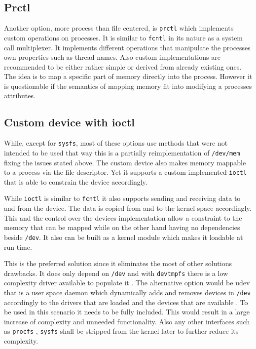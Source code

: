 \documentclass[
a4paper,
12pt,
notitlepage,
parskip=half,
DIV=11,
]{scrbook}
\begin{document}
		\subsection{Prctl}
		
		Another option, more process than file centered, is \texttt{prctl} which implements custom operations on processes.
		It is similar to \texttt{fcntl} in its nature as a system call multiplexer.
		It implements different operations that manipulate the processes own properties such as thread names.
		Also custom implementations are recommended to be either rather simple or derived from already existing ones.
		The idea is to map a specific part of memory directly into the process.
		However it is questionable if the semantics of mapping memory fit into modifying a processes attributes. \citep{syscall} \citep{prctl}
		
		\subsection{Custom device with ioctl}
		\label{hwio}
		
		While, except for \texttt{sysfs}, most of these options use methods that were not intended to be used that way this is a partially reimplementation of \texttt{/dev/mem} fixing the issues stated above.
		The custom device also makes memory mappable to a process via the file descriptor.
		Yet it supports a custom implemented \texttt{ioctl} that is able to constrain the device accordingly.
		
		While \texttt{ioctl} is similar to \texttt{fcntl} it also supports sending and receiving data to and from the device.
		The data is copied from and to the kernel space accordingly.
		This and the control over the devices implementation allow a constraint to the memory that can be mapped while on the other hand having no dependencies beside \texttt{/dev}.
		It also can be built as a kernel module which makes it loadable at run time. \citep{ioctl}
		
		This is the preferred solution since it eliminates the most of other solutions drawbacks.
		It does only depend on \texttt{/dev} and with \texttt{devtmpfs} there is a low complexity driver available to populate it \citep{devtmpfs}.
		The alternative option would be udev that is a user space daemon which dynamically adds and removes devices in \texttt{/dev} accordingly to the drivers that are loaded and the devices that are available \citep{udev}.
		To be used in this scenario it needs to be fully included.
		This would result in a large increase of complexity and unneeded functionality.
		Also any other interfaces such as \texttt{procfs} \citep{procfs}, \texttt{sysfs} \citep{sysfs} shall be stripped from the kernel later to further reduce its complexity.
		
\end{document}
